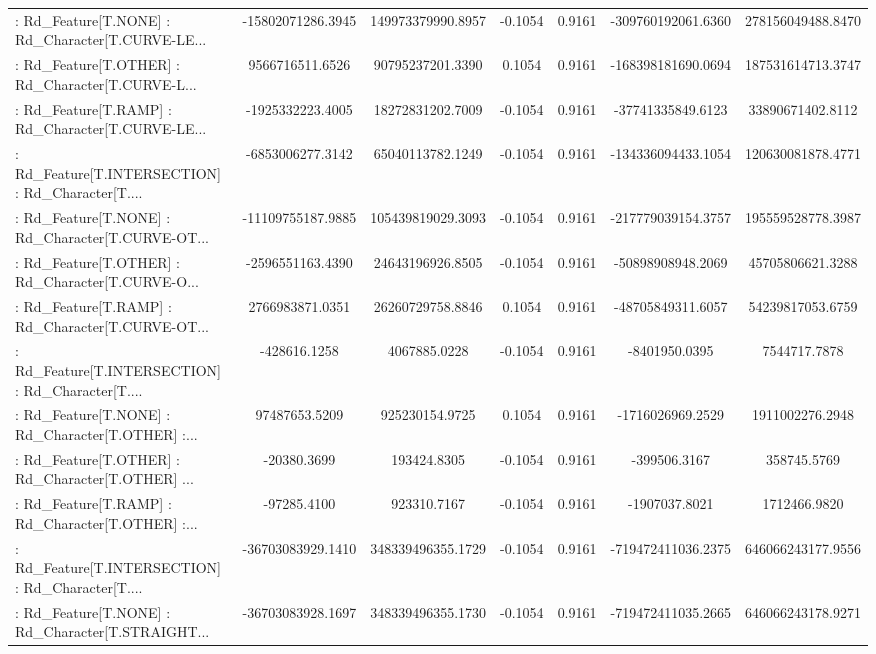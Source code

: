 \begin{longtable}{p{4cm}cccccc}
 : Rd\_Feature[T.NONE] : Rd\_Character[T.CURVE-LE... & -15802071286.3945 & 149973379990.8957 & -0.1054 &       0.9161 & -309760192061.6360 & 278156049488.8470 \\
 : Rd\_Feature[T.OTHER] : Rd\_Character[T.CURVE-L... &   9566716511.6526 &  90795237201.3390 &  0.1054 &       0.9161 & -168398181690.0694 & 187531614713.3747 \\
 : Rd\_Feature[T.RAMP] : Rd\_Character[T.CURVE-LE... &  -1925332223.4005 &  18272831202.7009 & -0.1054 &       0.9161 &  -37741335849.6123 &  33890671402.8112 \\
 : Rd\_Feature[T.INTERSECTION] : Rd\_Character[T.... &  -6853006277.3142 &  65040113782.1249 & -0.1054 &       0.9161 & -134336094433.1054 & 120630081878.4771 \\
 : Rd\_Feature[T.NONE] : Rd\_Character[T.CURVE-OT... & -11109755187.9885 & 105439819029.3093 & -0.1054 &       0.9161 & -217779039154.3757 & 195559528778.3987 \\
 : Rd\_Feature[T.OTHER] : Rd\_Character[T.CURVE-O... &  -2596551163.4390 &  24643196926.8505 & -0.1054 &       0.9161 &  -50898908948.2069 &  45705806621.3288 \\
 : Rd\_Feature[T.RAMP] : Rd\_Character[T.CURVE-OT... &   2766983871.0351 &  26260729758.8846 &  0.1054 &       0.9161 &  -48705849311.6057 &  54239817053.6759 \\
 : Rd\_Feature[T.INTERSECTION] : Rd\_Character[T.... &      -428616.1258 &      4067885.0228 & -0.1054 &       0.9161 &      -8401950.0395 &      7544717.7878 \\
 : Rd\_Feature[T.NONE] : Rd\_Character[T.OTHER] :... &     97487653.5209 &    925230154.9725 &  0.1054 &       0.9161 &   -1716026969.2529 &   1911002276.2948 \\
 : Rd\_Feature[T.OTHER] : Rd\_Character[T.OTHER] ... &       -20380.3699 &       193424.8305 & -0.1054 &       0.9161 &       -399506.3167 &       358745.5769 \\
 : Rd\_Feature[T.RAMP] : Rd\_Character[T.OTHER] :... &       -97285.4100 &       923310.7167 & -0.1054 &       0.9161 &      -1907037.8021 &      1712466.9820 \\
 : Rd\_Feature[T.INTERSECTION] : Rd\_Character[T.... & -36703083929.1410 & 348339496355.1729 & -0.1054 &       0.9161 & -719472411036.2375 & 646066243177.9556 \\
 : Rd\_Feature[T.NONE] : Rd\_Character[T.STRAIGHT... & -36703083928.1697 & 348339496355.1730 & -0.1054 &       0.9161 & -719472411035.2665 & 646066243178.9271 \\

\end{longtable}
